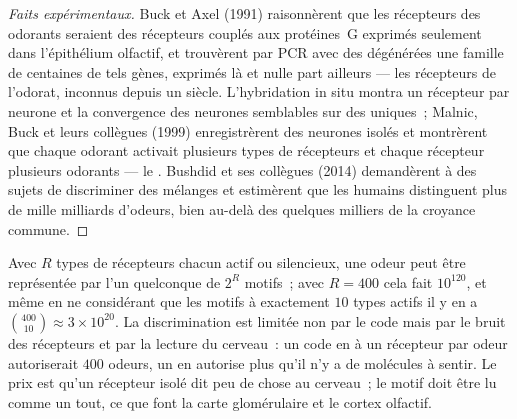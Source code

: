 \begin{proof}[Faits expérimentaux]
Buck et Axel (1991) raisonnèrent que les récepteurs des odorants
seraient des récepteurs couplés aux protéines~G exprimés seulement dans
l'épithélium olfactif, et trouvèrent par PCR avec des 
dégénérées une famille de centaines de tels gènes, exprimés là et nulle
part ailleurs --- les récepteurs de l'odorat, inconnus depuis un siècle.
L'hybridation in situ montra un récepteur par neurone et la convergence
des neurones semblables sur des  uniques~; Malnic, Buck et
leurs collègues (1999) enregistrèrent des neurones isolés et montrèrent
que chaque odorant activait plusieurs types de récepteurs et chaque
récepteur plusieurs odorants --- le . Bushdid et ses
collègues (2014) demandèrent à des sujets de discriminer des mélanges et
estimèrent que les humains distinguent plus de mille milliards d'odeurs,
bien au-delà des quelques milliers de la croyance commune.
\end{proof}

\begin{proposition}\label{prop:b3:sensory-systems:combinatorial}
Avec $R$ types de récepteurs chacun actif ou silencieux, une odeur peut
être représentée par l'un quelconque de $2^{R}$ motifs~; avec $R = 400$
cela fait $10^{120}$, et même en ne considérant que les motifs à
exactement $10$ types actifs il y en a
$\binom{400}{10} \approx 3\times 10^{20}$. La discrimination est limitée
non par le code mais par le bruit des récepteurs et par la lecture du
cerveau~: un code en  à un récepteur par odeur
autoriserait $400$ odeurs, un  en autorise plus qu'il
n'y a de molécules à sentir. Le prix est qu'un récepteur isolé dit peu
de chose au cerveau~; le motif doit être lu comme un tout, ce que font
la carte glomérulaire et le cortex olfactif.
\end{proposition}


